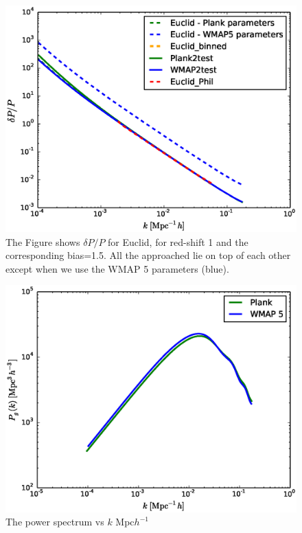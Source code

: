 \documentclass[10pt,a4paper]{article}
\begin{document}
\begin{figure}
\includegraphics[width=1.0\textwidth]{deltaP_ov_p_Euclid.eps}
\caption{The Figure shows $\delta P/P$  for Euclid, for red-shift 1 and the corresponding bias=1.5. All the approached lie on top of each other except when we use the WMAP 5 parameters (blue).}
\label{fig:cosmic_limit_Euclid_2}
\end{figure}

\begin{figure}
\includegraphics[width=1.0\textwidth]{pk.eps}
\caption{The power spectrum vs $k$ Mpc$h^{-1}$}
\label{fig:pk_vs_k}
\end{figure}
 
\end{document}
